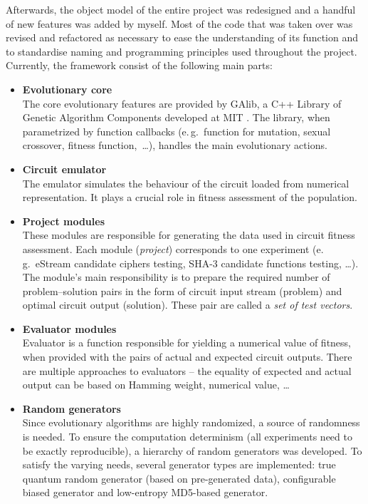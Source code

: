 \documentclass[12pt,oneside]{fithesis2}
\newcommand{\squarebullet}{\textcolor{black}{\raisebox{0.15em}{\rule{4pt}{4pt}}}}
\newenvironment{myItemize}{
  \begin{itemize}[leftmargin=2em,rightmargin=1em,itemsep=\parskip ,parsep=0em,topsep=0em,partopsep=0em]
  \renewcommand{\labelitemi}{\squarebullet}
  \renewcommand{\labelitemii}{$\diamond$}
}{
  \end{itemize}
}
\begin{document}
Afterwards, the object model of the entire project was redesigned and a handful of new features was added by myself. 
Most of the code that was taken over was revised and refactored as necessary
to ease the understanding of its function and to standardise naming and programming principles used throughout the project. 
Currently, the framework consist of the following main parts:
\begin{myItemize}
\item \textbf{Evolutionary core}\\
The core evolutionary features are provided by GAlib, a C++ Library of Genetic Algorithm Components developed at MIT \parencite{galib}.
The library, when parametrized by function callbacks (e.\,g.\ function for mutation, sexual crossover, fitness function,~\dots),
handles the main evolutionary actions.
\item \textbf{Circuit emulator}\\
The emulator simulates the behaviour of the circuit loaded from numerical representation. It plays a crucial role in
fitness assessment of the population.
\item \textbf{Project modules}\\
These modules are responsible for generating the data used in circuit fitness assessment. Each module (\textit{project}) corresponds
to one experiment (e.\,g.\ eStream candidate ciphers testing, SHA-3 candidate functions testing, \dots). The module's main
responsibility is to prepare the required number of problem--solution pairs in the form of circuit input stream (problem)
and optimal circuit output (solution). These pair are called a \textit{set of test vectors}.
\item \textbf{Evaluator modules}\\
Evaluator is a function responsible for yielding a numerical value of fitness, when provided with the pairs of
actual and expected circuit outputs. There are multiple approaches to evaluators -- the equality of expected and
actual output can be based on Hamming weight, numerical value, \dots
\item \textbf{Random generators}\\
Since evolutionary algorithms are highly randomized, a source of randomness is needed. To ensure the
computation determinism (all experiments need to be exactly reproducible), a hierarchy of random generators was developed.
To satisfy the varying needs, several generator types are implemented: true quantum random generator (based on pre-generated data),
configurable biased generator and low-entropy MD5-based generator.

\end{myItemize}
\end{document}

